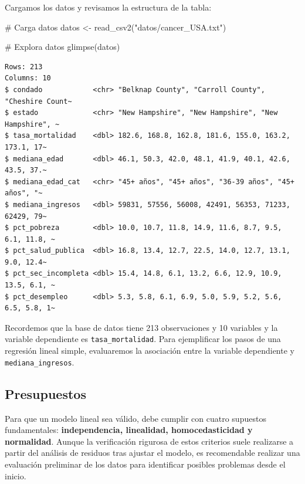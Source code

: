 \documentclass[
  spanish,
  a4paper,
]{scrbook}
\newenvironment{Shaded}{\begin{snugshade}}{\end{snugshade}}
\newcommand{\CommentTok}[1]{\textcolor[rgb]{0.37,0.37,0.37}{#1}}
\newcommand{\FunctionTok}[1]{\textcolor[rgb]{0.28,0.35,0.67}{#1}}
\newcommand{\NormalTok}[1]{\textcolor[rgb]{0.00,0.23,0.31}{#1}}
\newcommand{\OtherTok}[1]{\textcolor[rgb]{0.00,0.23,0.31}{#1}}
\newcommand{\StringTok}[1]{\textcolor[rgb]{0.13,0.47,0.30}{#1}}
\begin{document}
Cargamos los datos y revisamos la estructura de la tabla:

\begin{Shaded}
\begin{Highlighting}[]
\CommentTok{\# Carga datos}
\NormalTok{datos }\OtherTok{\textless{}{-}} \FunctionTok{read\_csv2}\NormalTok{(}\StringTok{"datos/cancer\_USA.txt"}\NormalTok{)}

\CommentTok{\# Explora datos}
\FunctionTok{glimpse}\NormalTok{(datos)}
\end{Highlighting}
\end{Shaded}

\begin{verbatim}
Rows: 213
Columns: 10
$ condado            <chr> "Belknap County", "Carroll County", "Cheshire Count~
$ estado             <chr> "New Hampshire", "New Hampshire", "New Hampshire", ~
$ tasa_mortalidad    <dbl> 182.6, 168.8, 162.8, 181.6, 155.0, 163.2, 173.1, 17~
$ mediana_edad       <dbl> 46.1, 50.3, 42.0, 48.1, 41.9, 40.1, 42.6, 43.5, 37.~
$ mediana_edad_cat   <chr> "45+ años", "45+ años", "36-39 años", "45+ años", "~
$ mediana_ingresos   <dbl> 59831, 57556, 56008, 42491, 56353, 71233, 62429, 79~
$ pct_pobreza        <dbl> 10.0, 10.7, 11.8, 14.9, 11.6, 8.7, 9.5, 6.1, 11.8, ~
$ pct_salud_publica  <dbl> 16.8, 13.4, 12.7, 22.5, 14.0, 12.7, 13.1, 9.0, 12.4~
$ pct_sec_incompleta <dbl> 15.4, 14.8, 6.1, 13.2, 6.6, 12.9, 10.9, 13.5, 6.1, ~
$ pct_desempleo      <dbl> 5.3, 5.8, 6.1, 6.9, 5.0, 5.9, 5.2, 5.6, 6.5, 5.8, 1~
\end{verbatim}

Recordemos que la base de datos tiene 213 observaciones y 10 variables y
la variable dependiente es \texttt{tasa\_mortalidad}. Para ejemplificar
los pasos de una regresión lineal simple, evaluaremos la asociación
entre la variable dependiente y \texttt{mediana\_ingresos}.

\subsection{Presupuestos}\label{presupuestos}

Para que un modelo lineal sea válido, debe cumplir con cuatro supuestos
fundamentales: \textbf{independencia, linealidad, homocedasticidad y
normalidad}. Aunque la verificación rigurosa de estos criterios suele
realizarse a partir del análisis de residuos tras ajustar el modelo, es
recomendable realizar una evaluación preliminar de los datos para
identificar posibles problemas desde el inicio.
\end{document}
